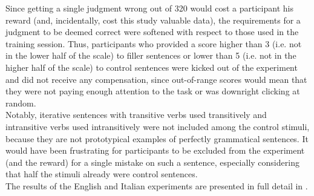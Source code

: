 Since getting a single judgment wrong out of 320 would cost a participant his reward (and, incidentally, cost this study valuable data), the requirements for a judgment to be deemed correct were softened with respect to those used in the training session. Thus, participants who provided a score higher than 3 (i.e. not in the lower half of the scale) to filler sentences or lower than 5 (i.e. not in the higher half of the scale) to control sentences were kicked out of the experiment and did not receive any compensation, since out-of-range scores would mean that they were not paying enough attention to the task or was downright clicking at random.\\ Notably, iterative sentences with transitive verbs used transitively and intransitive verbs used intransitively were not included among the control stimuli, because they are not prototypical examples of perfectly grammatical sentences. It would have been frustrating for participants to be excluded from the experiment (and the reward) for a single mistake on such a sentence, especially considering that half the stimuli already were control sentences.\\
The results of the English and Italian experiments are presented in full detail in .
